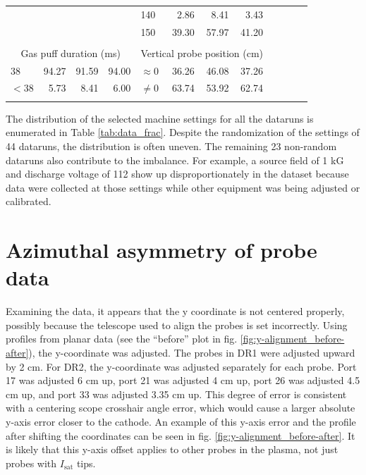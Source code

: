 \begin{table}
\begin{tabular}{lrrr|lrrr|lrrr}
                      & & & & 140 & 2.86 & 8.41 & 3.43     &                       & & & \\
                      & & & & 150 & 39.30 & 57.97 & 41.20  &                       & & & \\
		\\
		\multicolumn{4}{c|}{Gas puff duration (ms)} & \multicolumn{4}{c}{Vertical probe position (cm)}\\
		\cline{0-7} \cline{0-7}
		$38$ & 94.27 & 91.59 & 94.00 & $\approx 0$ & 36.26 & 46.08 & 37.26 & \\
		$<38$ & 5.73 & 8.41 & 6.00    & $\neq 0$ & 63.74 & 53.92 & 62.74    & \\
		\multicolumn{12}{l}{}
	\end{tabular}
\end{table}

The distribution of the selected machine settings for all the dataruns is enumerated in Table \ref{tab:data_frac}. Despite the randomization of the settings of 44 dataruns, the distribution is often uneven. The remaining 23 non-random dataruns also contribute to the imbalance. For example, a source field of 1 kG and discharge voltage of 112 show up disproportionately in the dataset because data were collected at those settings while other equipment was being adjusted or calibrated.

\section{Azimuthal asymmetry of probe data}

Examining the data, it appears that the y coordinate is not centered properly, possibly because the telescope used to align the probes is set incorrectly. Using profiles from planar data (see the ``before'' plot in fig. \ref{fig:y-alignment_before-after}), the y-coordinate was adjusted. The probes in DR1 were adjusted upward by 2 cm. For DR2, the y-coordinate was adjusted separately for each probe. Port 17 was adjusted 6 cm up, port 21 was adjusted 4 cm up, port 26 was adjusted 4.5 cm up, and port 33 was adjusted 3.35 cm up. This degree of error is consistent with a centering scope crosshair angle error, which would cause a larger absolute y-axis error closer to the cathode. An example of this y-axis error and the profile after shifting the coordinates can be seen in fig. \ref{fig:y-alignment_before-after}. It is likely that this y-axis offset applies to other probes in the plasma, not just probes with $I_\text{sat}$ tips. 

